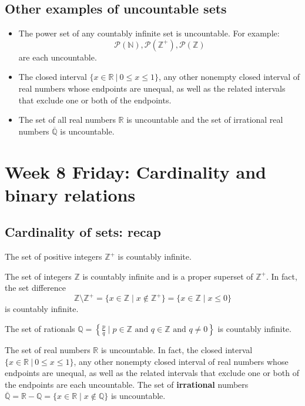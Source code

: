\documentclass[12pt, oneside]{article}
\begin{document}
  \subsection*{Other examples of uncountable sets}


\begin{itemize}
    \item The power set of any countably infinite set is uncountable. For example:
    \[
        \mathcal{P}(\mathbb{N}), \mathcal{P}(\mathbb{Z^+}), \mathcal{P}(\mathbb{Z})
    \]
    are each uncountable.
    \item The closed interval $\{x \in \mathbb{R} ~|~ 0 \leq x \leq 1\}$, any other nonempty closed interval of real numbers whose endpoints are 
    unequal, as well as the related intervals that exclude one or both of the endpoints.
    \item The set of all real numbers $\mathbb{R}$ is uncountable and the set of irrational
    real numbers $\overline{\mathbb{Q}}$ is uncountable.
\end{itemize} 
\newpage
\section*{Week 8 Friday: Cardinality and binary relations}

\subsection*{Cardinality of sets: recap}



The set of positive integers $\mathbb{Z}^{+}$ is countably infinite.

The set of integers $\mathbb{Z}$ is countably infinite and is a proper superset of $\mathbb{Z}^{+}$. 
In fact, the set difference 
$$\mathbb{Z} \setminus \mathbb{Z}^{+} = \{ x \in \mathbb{Z} \mid x \notin \mathbb{Z}^+\} 
= \{ x \in \mathbb{Z} \mid x \leq 0 \}$$ is countably infinite.

The set of rationals 
$\mathbb{Q} = \left\{ \frac{p}{q} \mid p \in \mathbb{Z}  \text{ and  } 
q  \in \mathbb{Z} \text{ and } q \neq  0 \right\}$ is countably infinite.


The set of real numbers $\mathbb{R}$ is uncountable. In fact, the closed 
interval $\{x \in \mathbb{R} ~|~ 0 \leq x \leq 1\}$, 
any other nonempty closed interval of real numbers whose endpoints are 
unequal, as well as the related intervals that exclude one or both of the endpoints are
each uncountable.
The set of {\bf irrational} numbers $\overline{\mathbb{Q}} = \mathbb{R} - \mathbb{Q}
= \{ x \in \mathbb{R} \mid x \notin \mathbb{Q} \}$ is uncountable.
\end{document}

